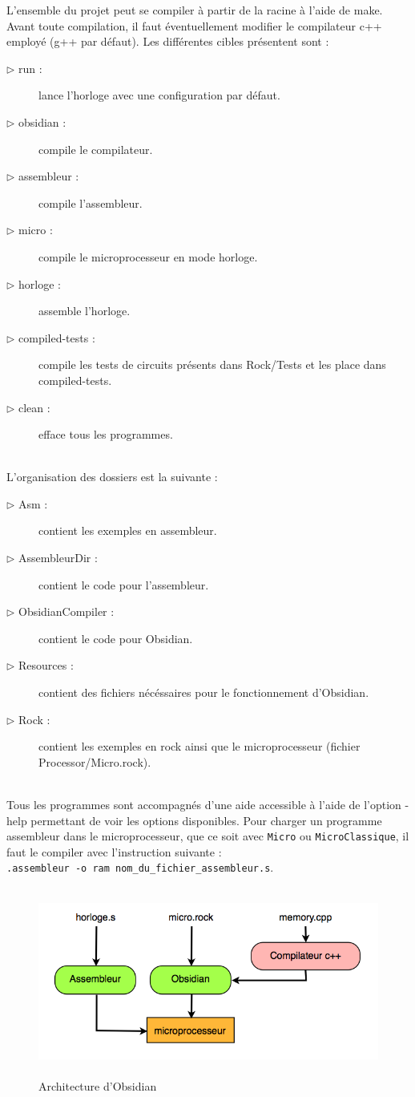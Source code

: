 \documentclass[13pt]{article}
\begin{document}
L'ensemble du projet peut se compiler à partir de la racine à l'aide de
make. Avant toute compilation, il faut éventuellement modifier le compilateur
c++ employé (g++ par défaut). Les différentes cibles présentent sont :
\begin{description}
\item[$\rhd$ run :] lance l'horloge avec une configuration par défaut.
\item[$\rhd$ obsidian :] compile le compilateur.
\item[$\rhd$ assembleur :] compile l'assembleur.
\item[$\rhd$ micro :] compile le microprocesseur en mode \og horloge\fg{}.
\item[$\rhd$ horloge :] assemble l'horloge.
\item[$\rhd$ compiled-tests :] compile les tests de circuits présents dans Rock/Tests
  et les place dans compiled-tests.
\item[$\rhd$ clean :] efface tous les programmes.
\end{description}
\text{}\\
L'organisation des dossiers est la suivante :
\begin{description}
\item[$\rhd$ Asm :] contient les exemples en assembleur.
\item[$\rhd$ AssembleurDir :] contient le code pour l'assembleur.
\item[$\rhd$ ObsidianCompiler :] contient le code pour Obsidian.
\item[$\rhd$ Resources :] contient des fichiers nécéssaires pour le fonctionnement
  d'Obsidian.
\item[$\rhd$ Rock :] contient les exemples en rock ainsi que le microprocesseur
  (fichier Processor/Micro.rock).
\end{description}
\text{}\\
Tous les programmes sont accompagnés d'une aide accessible à l'aide de l'option
-help permettant de voir les options disponibles. Pour charger un programme
assembleur dans le microprocesseur, que ce soit avec \texttt{Micro} ou
\texttt{MicroClassique}, il faut le compiler avec l'instruction suivante : \\
\texttt{.assembleur -o ram nom\_du\_fichier\_assembleur.s}.

\begin{figure}[!h]
\centering
\includegraphics[width=13.5cm,height=6.2cm]{exec.png}
\caption{Architecture d'Obsidian}
\label{Architecture d'Obsidian}
\end{figure}
\end{document}

